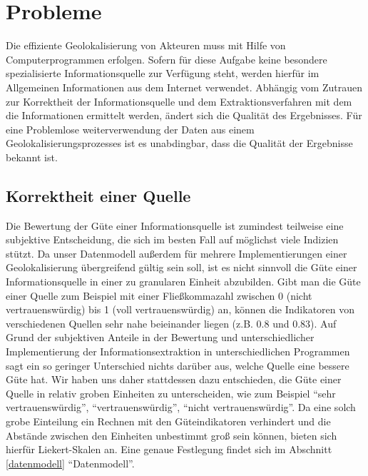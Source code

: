 \section{Probleme}
Die effiziente Geolokalisierung von Akteuren muss mit Hilfe von Computerprogrammen erfolgen. Sofern für diese Aufgabe keine besondere spezialisierte Informationsquelle zur Verfügung steht, werden hierfür im Allgemeinen Informationen aus dem Internet verwendet. Abhängig vom Zutrauen zur Korrektheit der Informationsquelle und dem Extraktionsverfahren mit dem die Informationen ermittelt werden, ändert sich die Qualität des Ergebnisses. Für eine Problemlose weiterverwendung der Daten aus einem Geolokalisierungsprozesses ist es unabdingbar, dass die Qualität der Ergebnisse bekannt ist.

\subsection{Korrektheit einer Quelle}
Die Bewertung der Güte einer Informationsquelle ist zumindest teilweise eine subjektive Entscheidung, die sich im besten Fall auf möglichst viele Indizien stützt. Da unser Datenmodell außerdem für mehrere Implementierungen einer Geolokalisierung übergreifend gültig sein soll, ist es nicht sinnvoll die Güte einer Informationsquelle in einer zu granularen Einheit abzubilden. Gibt man die Güte einer Quelle zum Beispiel mit einer Fließkommazahl zwischen 0 (nicht vertrauenswürdig) bis 1 (voll vertrauenswürdig) an, können die Indikatoren von verschiedenen Quellen sehr nahe beieinander liegen (z.B. 0.8 und 0.83). Auf Grund der subjektiven Anteile in der Bewertung und unterschiedlicher Implementierung der Informationsextraktion in unterschiedlichen Programmen sagt ein so geringer Unterschied nichts darüber aus, welche Quelle eine bessere Güte hat. Wir haben uns daher stattdessen dazu entschieden, die Güte einer Quelle in relativ groben Einheiten zu unterscheiden, wie zum Beispiel ``sehr vertrauenswürdig'', ``vertrauenswürdig'', ``nicht vertrauenswürdig''. Da eine solch grobe Einteilung ein Rechnen mit den Güteindikatoren verhindert und die Abstände zwischen den Einheiten unbestimmt groß sein können, bieten sich hierfür Liekert-Skalen an. Eine genaue Festlegung findet sich im Abschnitt \ref{datenmodell} ``Datenmodell''.

